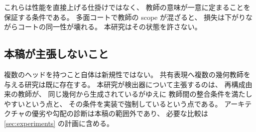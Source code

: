 これらは性能を直接上げる仕掛けではなく、
教師の意味が一意に定まることを保証する条件である。
多面コートで教師の scope が混ざると、
損失は下がりながらコートの同一性が壊れる。
本研究はその状態を許さない。

\subsection{本稿が主張しないこと}
\label{sec:detector_scope}

複数のヘッドを持つこと自体は新規性ではない。
共有表現へ複数の幾何教師を与える研究は既に存在する\cite{nie2021robust}。
本研究が検出器について主張するのは、
再構成由来の教師が、
同じ幾何から生成されているがゆえに
教師間の整合条件を満たしやすいという点と、
その条件を実装で強制しているという点である。
アーキテクチャの優劣や勾配の診断は本稿の範囲外であり、
必要な比較は\cref{sec:experiments} の計画に含める。
